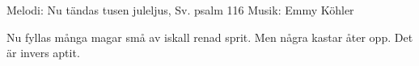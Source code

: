 \begin{song}

\begin{songmeta}
Melodi: Nu tändas tusen juleljus, Sv. psalm 116
Musik: Emmy Köhler
\end{songmeta}

\begin{songtext}
Nu fyllas många magar små
av iskall renad sprit.
Men några kastar åter opp.
Det är invers aptit.
\end{songtext}
\end{song}
